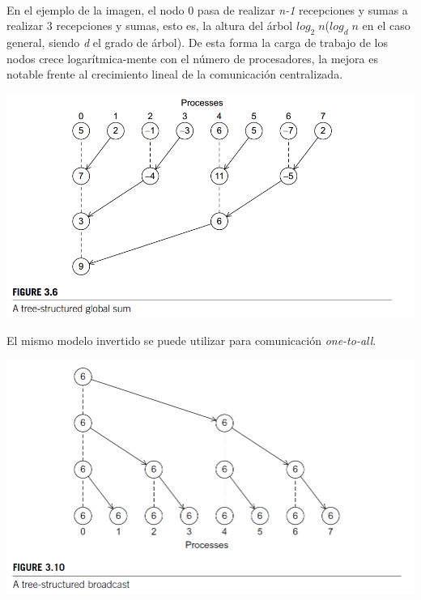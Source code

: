 \documentclass[es,gi]{ifirak}
\newenvironment{Figure}
  {\par\medskip\noindent\minipage{\columnwidth}}
  {\endminipage\par\medskip}
\begin{document}
\begin{multicols}{2}
\paragraph{}
En el ejemplo de la imagen, el nodo 0 pasa de realizar \textit{n-1} recepciones y sumas a realizar 3 recepciones y sumas, esto es, la altura del árbol $log_2\;n$($log_d\;n$ en el caso general, siendo \textit{d} el grado de árbol). De esta forma la carga de trabajo de los nodos crece logarítmica-mente con el número de procesadores, la mejora es notable frente al crecimiento lineal de la comunicación centralizada.

\begin{Figure}
	\centering
	\includegraphics[width=1\columnwidth]{TreeSum.png}
	\label{figure}
\end{Figure}

El mismo modelo invertido se puede utilizar para comunicación \textit{one-to-all}.
\begin{Figure}
	\centering
		\includegraphics[width=1\columnwidth]{TreeBroadcast.png}
\end{Figure}


\end{multicols}
\end{document}
